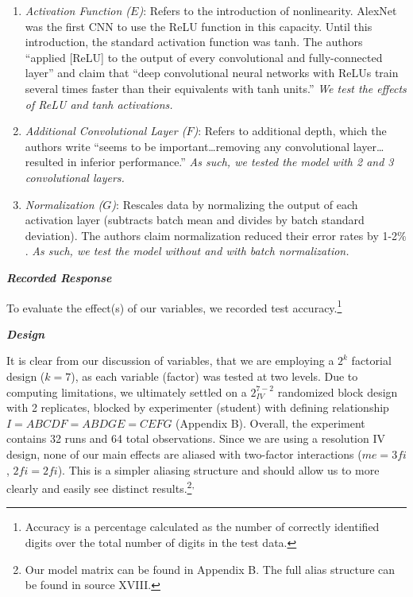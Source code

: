 \documentclass[12pt]{article}
\begin{document}
\begin{enumerate}
\item{\textit{Activation Function ($E$)}: Refers to the introduction of nonlinearity. AlexNet was the first CNN to use the ReLU function in this capacity. Until this introduction, the standard activation function was tanh. The authors “applied [ReLU] to the output of every convolutional and fully-connected layer”  and claim that “deep convolutional neural networks with ReLUs train several times faster than their equivalents with tanh units.”  \textit{We test the effects of ReLU and tanh activations. }}

\item{\textit{Additional Convolutional Layer ($F$)}: Refers to additional depth, which the authors write “seems to be important…removing any convolutional layer…resulted in inferior performance.”  \textit{As such, we tested the model with 2 and 3 convolutional layers. }}

\item{\textit{Normalization ($G$)}: Rescales data by normalizing the output of each activation layer (subtracts batch mean and divides by batch standard deviation). The authors claim normalization reduced their error rates by 1-2$\%$. \textit{As such, we test the model without and with batch normalization. }}

\end{enumerate}

\vspace{.5pc}
\noindent \textbf{\textit{Recorded Response}}
\vspace{.1pc}

To evaluate the effect(s) of our variables, we recorded test accuracy.\footnote{Accuracy is a percentage calculated as the number of correctly identified digits over the total number of digits in the test data. }

\vspace{.5pc}
\newpage
\noindent \textbf{\textit{Design}}
\vspace{.1pc}

It is clear from our discussion of variables, that we are employing a $2^k$ factorial design ($k = 7$), as each variable (factor) was tested at two levels. Due to computing limitations, we ultimately settled on a $2_{IV}^{7-2}$ randomized block design with 2 replicates, blocked by experimenter (student) with defining relationship $I = ABCDF = ABDGE = CEFG$ (Appendix B). Overall, the experiment contains 32 runs and 64 total observations. Since we are using a resolution IV design, none of our main effects are aliased with two-factor interactions ($me = 3fi$, $2fi = 2fi$). This is a simpler aliasing structure and should allow us to more clearly and easily see distinct results.\footnote{ Our model matrix can be found in Appendix B. The full alias structure can be found in source XVIII.}\textsuperscript{,}
\end{document}
